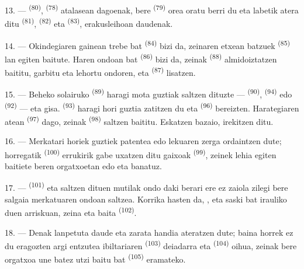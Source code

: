 13. ---  \textsuperscript{(80)}, 
\textsuperscript{(78)} atalasean dagoenak, bere 
\textsuperscript{(79)} orea oratu berri du eta labetik atera ditu
 \textsuperscript{(81)}, 
\textsuperscript{(82)} eta  \textsuperscript{(83)},
erakusleihoan daudenak.

14. --- Okindegiaren gainean  trebe bat \textsuperscript{(84)} bizi
da, zeinaren etxean  batzuek \textsuperscript{(85)} lan egiten
baitute. Haren ondoan  bat
\textsuperscript{(86)} bizi da, zeinak  \textsuperscript{(88)}
almidoiztatzen baititu, garbitu eta lehortu ondoren, eta
 \textsuperscript{(87)} lisatzen.

\VUsaut{4.0mm}
\VUsaut{3.0mm}

15. --- Beheko solairuko  \textsuperscript{(89)} haragi mota
guztiak saltzen dituzte ---  \textsuperscript{(90)},
 \textsuperscript{(94)} edo 
\textsuperscript{(92)} ---  eta
 gisa. 
\textsuperscript{(93)} haragi hori guztia zatitzen du eta 
\textsuperscript{(96)} bereizten. Harategiaren atean 
\textsuperscript{(97)} dago, zeinak  \textsuperscript{(98)}
saltzen baititu. Eskatzen bazaio, irekitzen ditu.

16. --- Merkatari horiek guztiek patentea edo lekuaren zerga ordaintzen dute;
horregatik  \textsuperscript{(100)} errukirik gabe uxatzen
ditu  gaixoak \textsuperscript{(99)}, zeinek
lehia egiten baitiete beren orgatxoetan  edo  eta  banatuz.

\VUsaut{4.0mm}
\VUsaut{3.0mm}

17. ---  \textsuperscript{(101)} eta  saltzen
dituen mutilak ondo daki berari ere ez zaiola zilegi bere salgaia merkatuaren
ondoan saltzea. Korrika hasten da, , 
eta  saski bat irauliko duen arriskuan, zeina 
eta   baita \textsuperscript{(102)}.

18. --- Denak lanpetuta daude eta zarata handia ateratzen dute; baina horrek ez du
eragozten argi entzutea  ibiltariaren \textsuperscript{(103)}
deiadarra eta  \textsuperscript{(104)} oihua, zeinak
bere orgatxoa une batez utzi baitu  bat
\textsuperscript{(105)} eramateko.
\VUsaut{6.0mm}
\VUfilet{22mm}
